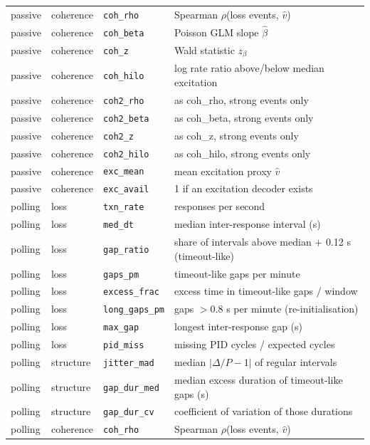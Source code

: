 \documentclass[10pt]{article}
\begin{document}
\begin{table}[!htbp]
{\begin{tabular}{@{}lllp{9cm}@{}}
passive & coherence & \texttt{coh\_rho} & Spearman $\rho$(loss events, $\hat v$) \\
passive & coherence & \texttt{coh\_beta} & Poisson GLM slope $\hat\beta$ \\
passive & coherence & \texttt{coh\_z} & Wald statistic $z_\beta$ \\
passive & coherence & \texttt{coh\_hilo} & log rate ratio above/below median excitation \\
passive & coherence & \texttt{coh2\_rho} & as coh\_rho, strong events only \\
passive & coherence & \texttt{coh2\_beta} & as coh\_beta, strong events only \\
passive & coherence & \texttt{coh2\_z} & as coh\_z, strong events only \\
passive & coherence & \texttt{coh2\_hilo} & as coh\_hilo, strong events only \\
passive & coherence & \texttt{exc\_mean} & mean excitation proxy $\hat v$ \\
passive & coherence & \texttt{exc\_avail} & 1 if an excitation decoder exists \\
polling & loss & \texttt{txn\_rate} & responses per second \\
polling & loss & \texttt{med\_dt} & median inter-response interval (s) \\
polling & loss & \texttt{gap\_ratio} & share of intervals above median + 0.12 s (timeout-like) \\
polling & loss & \texttt{gaps\_pm} & timeout-like gaps per minute \\
polling & loss & \texttt{excess\_frac} & excess time in timeout-like gaps / window \\
polling & loss & \texttt{long\_gaps\_pm} & gaps $>0.8$ s per minute (re-initialisation) \\
polling & loss & \texttt{max\_gap} & longest inter-response gap (s) \\
polling & loss & \texttt{pid\_miss} & missing PID cycles / expected cycles \\
polling & structure & \texttt{jitter\_mad} & median $|\Delta/P-1|$ of regular intervals \\
polling & structure & \texttt{gap\_dur\_med} & median excess duration of timeout-like gaps (s) \\
polling & structure & \texttt{gap\_dur\_cv} & coefficient of variation of those durations \\
polling & coherence & \texttt{coh\_rho} & Spearman $\rho$(loss events, $\hat v$) \\

\end{tabular}}
\end{table}
\end{document}
